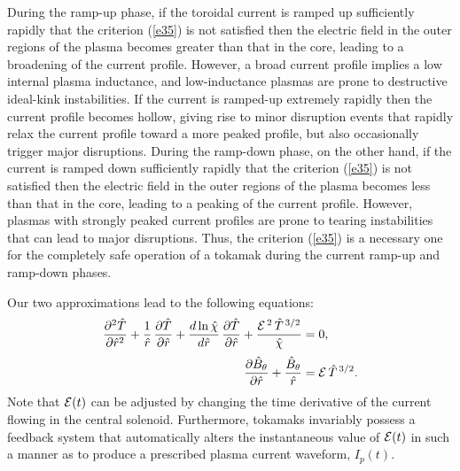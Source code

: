 \documentclass[12pt,prb,aps]{revtex4-1}
\begin{document}
During the ramp-up phase, if the toroidal current is ramped up sufficiently rapidly that the criterion (\ref{e35}) is not satisfied then the electric field in the outer regions of the plasma becomes
greater than that in the core, leading to a broadening of the current profile. However, a broad current profile implies a low internal plasma inductance,
and low-inductance plasmas are prone to destructive ideal-kink instabilities.\cite{wesson,cheng} 
If the current is ramped-up extremely rapidly then the current profile becomes hollow, giving rise to
minor disruption events that rapidly relax the current profile toward a  more peaked profile, but also occasionally trigger major disruptions.\cite{granetz}
During the ramp-down phase, on the other hand, if the current is ramped down sufficiently rapidly that the criterion (\ref{e35}) is not satisfied then the electric field in the outer regions of the plasma becomes
less than that in the core, leading to a peaking of the current profile. However, plasmas with strongly peaked current profiles are prone to tearing instabilities
that can lead to major disruptions.\cite{wesson,cheng} Thus, the criterion (\ref{e35}) is a necessary one for  the completely safe operation of a tokamak during the
current ramp-up and ramp-down phases. 

Our two approximations lead to the following equations:
\begin{align}\label{e38}
\frac{\partial^2\hat{T}}{\partial \hat{r}^2} 
 +\frac{1}{\hat{r}}\,\frac{\partial\hat{T}}{\partial\hat{r}} + \frac{d\ln\hat{\chi}}{d\hat{r}}\,\frac{\partial\hat{T}}{\partial\hat{r}}
 + \frac{{\cal E}^{\,2}\,\hat{T}^{\,3/2}}{\hat{\chi}}&=0,\\[0.5ex]
 \frac{\partial\hat{B}_\theta}{\partial \hat{r}} + \frac{\hat{B}_\theta}{\hat{r}}&= {\cal E}\,\hat{T}^{\,3/2}.\label{e39}
\end{align}
Note that ${\cal E}(t)$ can be adjusted by changing the time derivative of the  current flowing in the central solenoid.  Furthermore, tokamaks
invariably  possess a feedback system that automatically alters the instantaneous value of ${\cal E}(t)$ in such a manner as to produce a prescribed plasma
current waveform, $I_p(t)$. 
\end{document}
